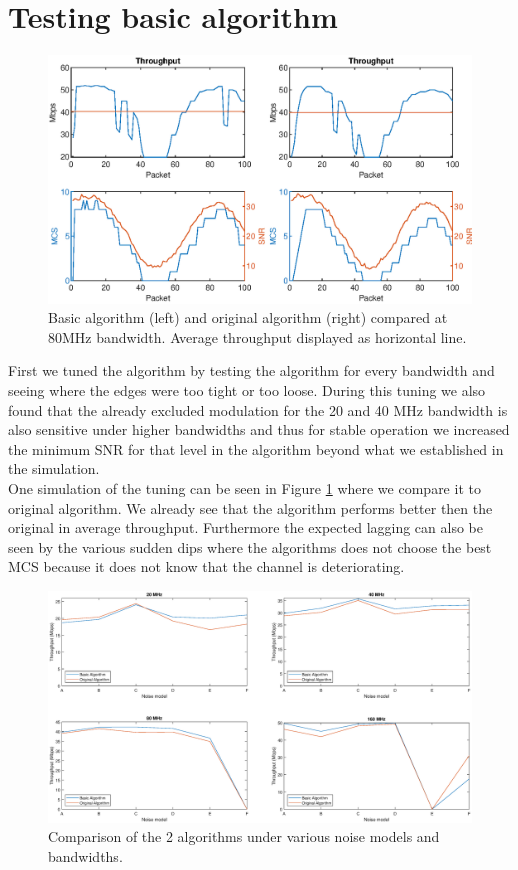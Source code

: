 \documentclass[a4paper]{article}
\begin{document}
\section{Testing basic algorithm}

\begin{figure}[h]
\centering
\includegraphics[scale=1]{steptwo80.eps}
\caption{Basic algorithm (left) and original algorithm (right) compared at 80MHz bandwidth. Average throughput displayed as horizontal line.}
\label{fig:steptwo_single}
\end{figure}
First we tuned the algorithm by testing the algorithm for every bandwidth and seeing where the edges were too tight or too loose. 
During this tuning we also found that the already excluded modulation for the 20 and 40 MHz bandwidth is also sensitive under higher bandwidths and thus for stable operation we increased the minimum SNR for that level in the algorithm beyond what we established in the simulation.\\
One simulation of the tuning can be seen in Figure \ref{fig:steptwo_single} where we compare it to original algorithm. We already see that the algorithm performs better then the original in average throughput. Furthermore the expected lagging can also be seen by the various sudden dips where the algorithms does not choose the best MCS because it does not know that the channel is deteriorating.\\
\begin{figure}[h!]
\centering
\includegraphics[scale=.4]{steptwo.eps}
\caption{Comparison of the 2 algorithms under various noise models and bandwidths.}
\label{fig:steptwo}
\end{figure}
\end{document}
